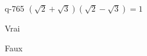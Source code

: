 \begin{truefalse}{q-765}
$(\sqrt{2}+\sqrt{3})(\sqrt{2}-\sqrt{3})=1$
\item Vrai
\item* Faux
\end{truefalse}

